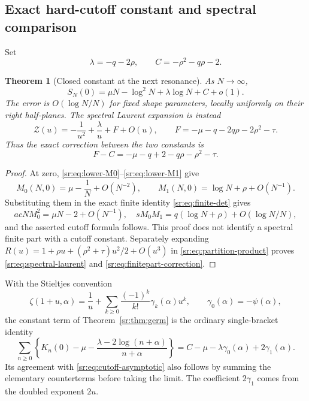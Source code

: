 \documentclass[11pt,letterpaper]{article}
\newtheorem{theorem}{Theorem}[section]
\theoremstyle{definition}
\theoremstyle{remark}
\numberwithin{equation}{section}
\begin{document}
\subsection{Exact hard-cutoff constant and spectral comparison}
Set
\begin{equation}\label{sr:eq:lambda-C}
 \lambda=-q-2\rho,\qquad C=-\rho^2-q\rho-2.
\end{equation}
\begin{theorem}[Closed constant at the next resonance]
\label{sr:thm:constant}
As $N\to\infty$,
\begin{equation}\label{sr:eq:cutoff-asymptotic}
 \boxed{\displaystyle
 S_N(0)=\mu N-\log^2N+\lambda\log N+C+o(1).}
\end{equation}
The error is $O(\log N/N)$ for fixed shape parameters, locally uniformly
on their right half-planes. The spectral Laurent expansion is instead
\begin{equation}\label{sr:eq:spectral-laurent}
 \mathcal Z(u)=-\frac1{u^2}+\frac\lambda u+F+O(u),\qquad
 F=-\mu-q-2q\rho-2\rho^2-\tau.
\end{equation}
Thus the exact correction between the two constants is
\begin{equation}\label{sr:eq:finitepart-correction}
 F-C=-\mu-q+2-q\rho-\rho^2-\tau.
\end{equation}
\end{theorem}
\begin{proof}
At zero, \eqref{sr:eq:lower-M0}--\eqref{sr:eq:lower-M1} give
\[
 M_0(N,0)=\mu-\frac1N+O(N^{-2}),\qquad
 M_1(N,0)=\log N+\rho+O(N^{-1}).
\]
Substituting them in the exact finite identity
\eqref{sr:eq:finite-det} gives
\[
 acNM_0^2=\mu N-2+O(N^{-1}),\quad
 sM_0M_1=q(\log N+\rho)+O(\log N/N),
\]
and the asserted cutoff formula follows. This proof does not identify
a spectral finite part with a cutoff constant. Separately expanding
$R(u)=1+\rho u+(\rho^2+\tau)u^2/2+O(u^3)$ in
\eqref{sr:eq:partition-product} proves \eqref{sr:eq:spectral-laurent}
and \eqref{sr:eq:finitepart-correction}.
\end{proof}

With the Stieltjes convention
\[
 \zeta(1+u,\alpha)=\frac1u+
 \sum_{k\ge0}\frac{(-1)^k}{k!}\gamma_k(\alpha)u^k,
 \qquad \gamma_0(\alpha)=-\psi(\alpha),
\]
the constant term of Theorem~\ref{sr:thm:germ} is the ordinary
single-bracket identity
\begin{equation}\label{sr:eq:D0}
 \boxed{\displaystyle
 \sum_{n\ge0}\left\{K_n(0)-\mu-
 \frac{\lambda-2\log(n+\alpha)}{n+\alpha}\right\}
 =C-\mu-\lambda\gamma_0(\alpha)+2\gamma_1(\alpha).}
\end{equation}
Its agreement with \eqref{sr:eq:cutoff-asymptotic} also follows by
summing the elementary counterterms before taking the limit. The
coefficient $2\gamma_1$ comes from the doubled exponent $2u$.
\end{document}
